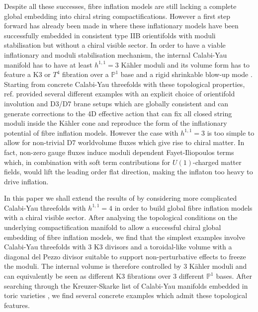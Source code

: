 \documentclass[11pt,a4paper]{article}
\newcommand{\mbb}{\mathbb}
\begin{document}
Despite all these successes, fibre inflation models are still lacking a complete global embedding into chiral string compactifications. However a first step forward has already been made in \cite{Cicoli:2016xae} where these inflationary models have been successfully embedded in consistent type IIB orientifolds with moduli stabilisation but without a chiral visible sector. In order to have a viable inflationary and moduli stabilisation mechanism, the internal Calabi-Yau manifold has to have at least $h^{1,1}=3$ K\"ahler moduli and its volume form has to feature a K3 or $T^4$ fibration over a $\mbb{P}^1$ base and a rigid  shrinkable blow-up mode \cite{Cicoli:2008va, Cicoli:2011it}. Starting from concrete Calabi-Yau threefolds with these topological properties, ref. \cite{Cicoli:2016xae} provided several different examples with an explicit choice of orientifold involution and D3/D7 brane setups which are globally consistent and can generate corrections to the 4D effective action that can fix all closed string moduli inside the K\"ahler cone and reproduce the form of the inflationary potential of fibre inflation models. However the case with $h^{1,1}=3$ is too simple to allow for non-trivial D7 worldvolume fluxes which give rise to chiral matter. In fact, non-zero gauge fluxes induce moduli dependent Fayet-Iliopoulos terms which, in combination with soft term contributions for $U(1)$-charged matter fields, would lift the leading order flat direction, making the inflaton too heavy to drive inflation. 

In this paper we shall extend the results of \cite{Cicoli:2016xae} by considering more complicated Calabi-Yau threefolds with $h^{1,1}=4$ in order to build global fibre inflation models with a chiral visible sector. After analysing the topological conditions on the underlying compactification manifold to allow a successful chiral global embedding of fibre inflation models, we find that the simplest examples involve Calabi-Yau threefolds with $3$ K3 divisors and a toroidal-like volume with a diagonal del Pezzo divisor suitable to support non-perturbative effects to freeze the moduli. The internal volume is therefore controlled by $3$ K\"ahler moduli and can equivalently be seen as different K3 fibrations over $3$ different $\mbb{P}^1$ bases. After searching through the Kreuzer-Skarke list of Calabi-Yau manifolds embedded in toric varieties \cite{Kreuzer:2000xy}, we find several concrete examples which admit these topological features. 
\end{document}
